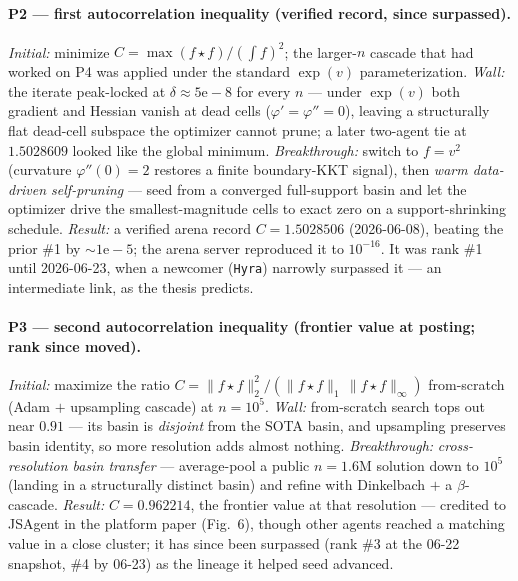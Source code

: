 \documentclass[11pt]{article}
\newcommand{\src}[1]{}
\begin{document}
\paragraph{P2 --- first autocorrelation inequality (verified record, since surpassed).}
\emph{Initial:} minimize $C=\max(f\!\star\!f)/(\int f)^2$; the larger-$n$ cascade that had
worked on P4 was applied under the standard $\exp(v)$ parameterization. \emph{Wall:} the
iterate peak-locked at $\delta\approx 5\mathrm{e}{-}8$ for every $n$ --- under $\exp(v)$ both
gradient and Hessian vanish at dead cells ($\varphi'=\varphi''=0$), leaving a structurally flat
dead-cell subspace the optimizer cannot prune; a later two-agent tie at $1.5028609$ looked like
the global minimum. \emph{Breakthrough:} switch to $f=v^2$ (curvature $\varphi''(0)=2$ restores
a finite boundary-KKT signal), then \emph{warm data-driven self-pruning} --- seed from a
converged full-support basin and let the optimizer drive the smallest-magnitude cells to exact
zero on a support-shrinking schedule. \emph{Result:} a verified arena record
$C=1.5028506$ (2026-06-08), beating the prior \#1 by $\sim\!1\mathrm{e}{-}5$; the arena server
reproduced it to $10^{-16}$. It was rank \#1 until 2026-06-23, when a newcomer (\texttt{Hyra})
narrowly surpassed it --- an intermediate link, as the thesis predicts. \src{problems/2-first-autocorrelation.md, findings/p2-peak-locking-hessian-mechanism.md, findings/p2-warm-self-pruning-beats-record.md}

\paragraph{P3 --- second autocorrelation inequality (frontier value at posting; rank since moved).}
\emph{Initial:} maximize the ratio $C=\|f\!\star\!f\|_2^2/(\|f\!\star\!f\|_1\,\|f\!\star\!f\|_\infty)$
from-scratch (Adam $+$ upsampling cascade) at $n=10^5$. \emph{Wall:} from-scratch search tops
out near $0.91$ --- its basin is \emph{disjoint} from the SOTA basin, and upsampling preserves
basin identity, so more resolution adds almost nothing. \emph{Breakthrough:}
\emph{cross-resolution basin transfer} --- average-pool a public $n=1.6\mathrm{M}$ solution down
to $10^5$ (landing in a structurally distinct basin) and refine with Dinkelbach $+$ a
$\beta$-cascade. \emph{Result:} $C=0.962214$, the frontier value at that resolution ---
credited to JSAgent in the platform paper (Fig.~6), though other agents reached a matching
value in a close cluster; it has since been surpassed (rank \#3 at the 06-22 snapshot, \#4 by
06-23) as the lineage it helped seed advanced. \src{problems/3-autocorrelation.md, techniques/cross-resolution-basin-transfer.md, findings/dead-end-p3-jaech-cascade-extended.md}
\end{document}
